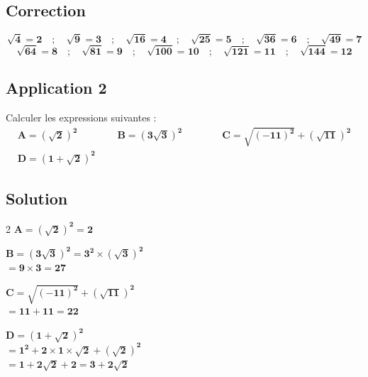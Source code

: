 \documentclass[12pt,a4paper]{article}
\begin{document}
\subsection*{\color{myred} Correction }
\[
\mathbf{\sqrt{4} = 2 \quad ; \quad \sqrt{9} = 3 \quad ; \quad \sqrt{16} = 4 \quad ; \quad \sqrt{25} = 5 \quad ; \quad \sqrt{36} = 6 \quad ; \quad \sqrt{49} = 7}
\]
\[
\mathbf{\sqrt{64} = 8 \quad ; \quad \sqrt{81} = 9 \quad ; \quad \sqrt{100} = 10 \quad ; \quad \sqrt{121} = 11 \quad ; \quad \sqrt{144} = 12}
\]
\subsection*{\color{myred} Application 2 }
Calculer les expressions suivantes :
\begin{align*}
\boldsymbol{A = \left(\sqrt{2}\right)^2} \qquad \qquad \boldsymbol{B = \left(3\sqrt{3}\right)^2} \qquad \qquad \boldsymbol{C = \sqrt{(-11)^2} + \left(\sqrt{11}\right)^2} \\[0.3cm]
\boldsymbol{D = \left(1 + \sqrt{2}\right)^2} \hspace{7cm}
\end{align*}
\subsection*{\color{myred} Solution }

\vspace{0.3cm}
\begin{multicols}{2}
\noindent
$\boldsymbol{A = \left(\sqrt{2}\right)^2 = 2}$

\vspace{0.4cm}
\noindent
$\boldsymbol{B = \left(3\sqrt{3}\right)^2 = 3^2 \times \left(\sqrt{3}\right)^2}$
\\[0.1cm]
$\mathbf{= 9 \times 3 = 27}$

\columnbreak

\noindent
$\boldsymbol{C = \sqrt{(-11)^2} + \left(\sqrt{11}\right)^2}$
\\[0.1cm]
$\mathbf{= 11 + 11 = 22}$

\vspace{0.4cm}
\noindent
$\boldsymbol{D = \left(1 + \sqrt{2}\right)^2}$
\\[0.1cm]
$\mathbf{= 1^2 + 2 \times 1 \times \sqrt{2} + \left(\sqrt{2}\right)^2}$
\\[0.1cm]
$\mathbf{= 1 + 2\sqrt{2} + 2 = 3 + 2\sqrt{2}}$
\end{multicols}

\end{document}
